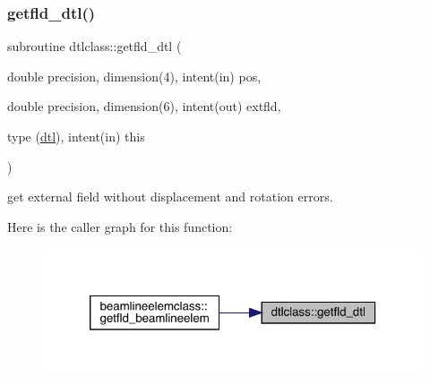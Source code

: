 \mbox{\label{namespacedtlclass_a9e97d93c8f7ec49afee134e3ffd3f900}} 
\subsubsection{\texorpdfstring{getfld\_dtl()}{getfld\_dtl()}}
{\footnotesize\ttfamily subroutine dtlclass\+::getfld\+\_\+dtl (\begin{DoxyParamCaption}\item[{double precision, dimension(4), intent(in)}]{pos,  }\item[{double precision, dimension(6), intent(out)}]{extfld,  }\item[{type (\mbox{\hyperlink{namespacedtlclass_structdtlclass_1_1dtl}{dtl}}), intent(in)}]{this }\end{DoxyParamCaption})}



get external field without displacement and rotation errors. 

Here is the caller graph for this function\+:\nopagebreak
\begin{figure}[H]
\begin{center}
\leavevmode
\includegraphics[width=320pt]{namespacedtlclass_a9e97d93c8f7ec49afee134e3ffd3f900_icgraph}
\end{center}
\end{figure}
\mbox{\label{namespacedtlclass_ab866f108c00b307f9e7a55731eadafa4}} 
